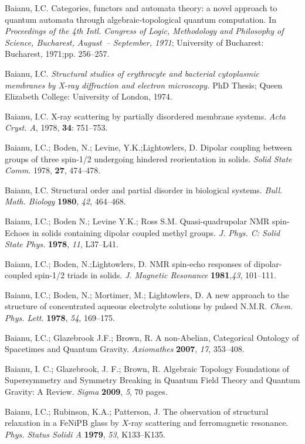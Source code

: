 \documentclass[12pt]{article}
\theoremstyle{plain}
\theoremstyle{definition}
\numberwithin{equation}{section}
\begin{document}
\begin{thebibliography}{99}
Baianu, I.C. Categories, functors and automata theory: a novel approach to quantum automata through algebraic-topological quantum computation. In {\em  Proceedings of the 4th Intl. Congress of Logic, Methodology and Philosophy of Science, Bucharest, August~-- September, 1971}; University of Bucharest: Bucharest, 1971;pp. 256--257.

Baianu, I.C. \emph{Structural studies of erythrocyte and bacterial cytoplasmic membranes by X-ray diffraction and electron microscopy.} PhD Thesis; Queen Elizabeth College: University of London, 1974.

Baianu, I.C.  X-ray scattering by partially disordered membrane systems. 
\emph{Acta Cryst. A}, 1978, {\bf 34}: 751--753.

Baianu, I.C.; Boden, N.; Levine, Y.K.;Lightowlers, D.  Dipolar coupling between groups of three spin-1/2 undergoing hindered reorientation in solids. {\it Solid State Comm.} 1978, {\bf 27}, 474--478.

Baianu, I.C.  Structural order and partial disorder in biological systems. {\em Bull. Math. Biology} {\bf 1980}, {\em 42}, 464--468.

Baianu, I.C.; Boden N.; Levine Y.K.; Ross S.M.  Quasi-quadrupolar NMR spin-Echoes in solids containing dipolar coupled methyl groups.  {\em J. Phys.  C: Solid State Phys.}
{\bf 1978}, {\em 11}, L37--L41.

Baianu, I.C.; Boden, N.;Lightowlers, D.  NMR spin-echo responses of dipolar-coupled spin-1/2 triads in solids. {\em J. Magnetic Resonance} {\bf 1981},{\em 43}, 101--111.

Baianu, I.C.; Boden, N.; Mortimer, M.; Lightowlers, D.  A new approach to the structure of concentrated aqueous electrolyte solutions by pulsed N.M.R. {\em Chem. Phys. Lett.} {\bf 1978}, {\em 54}, 169--175.

Baianu, I.C.; Glazebrook J.F.; Brown, R.  A non-Abelian, Categorical Ontology of Spacetimes and Quantum Gravity. {\em Axiomathes}  {\bf 2007}, {\em 17}, 353--408.

Baianu, I. C.; Glazebrook, J. F.; Brown, R.  Algebraic Topology Foundations of Supersymmetry and Symmetry Breaking in Quantum Field Theory and Quantum Gravity: A Review. {\em Sigma} {\bf 2009}, {\em 5}, 70 pages.

Baianu, I.C.; Rubinson,  K.A.; Patterson, J. The observation of structural relaxation in a FeNiPB glass by $X$-ray scattering and ferromagnetic resonance. {\em Phys. Status Solidi A} {\bf 1979}, {\em 53}, K133--K135.


\end{thebibliography}
\end{document}
